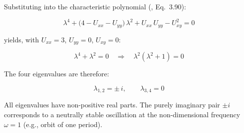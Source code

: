 Substituting into the characteristic polynomial (\parencite{wakker2015fundamentals}, Eq.~3.90):

$$
\lambda^4 + \bigl(4 - U_{xx} - U_{yy}\bigr)\,\lambda^2 + U_{xx}\,U_{yy} - U_{xy}^2 = 0
$$

yields, with $U_{xx} = 3$, $U_{yy} = 0$, $U_{xy} = 0$:

$$
\lambda^4 + \lambda^2 = 0 \quad\Longrightarrow\quad \lambda^2\!\left(\lambda^2 + 1\right) = 0 
$$

The four eigenvalues are therefore:

$$
\lambda_{1,2} = \pm\,i, \qquad \lambda_{3,4} = 0
$$

All eigenvalues have non-positive real parts. 
The purely imaginary pair $\pm i$ corresponds to a neutrally stable oscillation at the non-dimensional frequency $\omega = 1$ (e.g., orbit of one period).